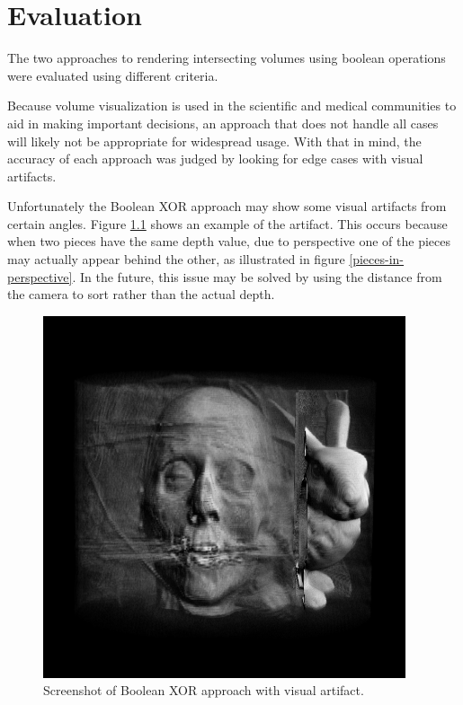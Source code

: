 \documentclass{report}
\begin{document}
\chapter{Evaluation}

The two approaches to rendering intersecting volumes using boolean operations
were evaluated using different criteria.

Because volume visualization is used in the scientific and medical communities
to aid in making important decisions, an approach that does not handle all cases
will likely not be appropriate for widespread usage.  With that in mind, the
accuracy of each approach was judged by looking for edge cases with visual
artifacts.

Unfortunately the Boolean XOR approach may show some visual artifacts from
certain angles.  Figure \ref{boolean-xor-with-artifact} shows an example of the
artifact.  This occurs because when two pieces have the same depth value, due to
perspective one of the pieces may actually appear behind the other, as
illustrated in figure \ref{pieces-in-perspective}.  In the future, this issue
may be solved by using the distance from the camera to sort rather than the
actual depth.

\begin{figure}
\centering
\includegraphics[width=0.95\textwidth]{boolean-xor-screenshot-3.png}
\caption{Screenshot of Boolean XOR approach with visual artifact.}
\label{boolean-xor-with-artifact}
\end{figure}
\end{document}
